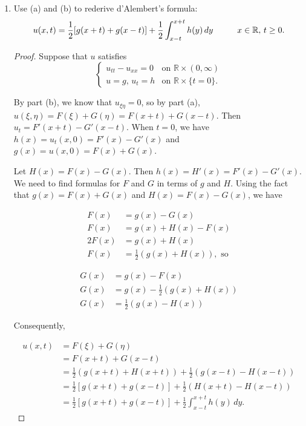 \documentclass[11pt,oneside,english]{amsart}
\theoremstyle{definition}
\newcommand{\pspace}{\hspace{10mm}}
\newcommand{\MB}[1]{\mathbb{#1}}
\begin{document}
\begin{enumerate}
\begin{enumerate}
\item Use (a) and (b) to rederive d'Alembert's formula:
\[
u(x,t)=\frac{1}{2}[g(x+t)+g(x-t)]+\frac{1}{2}\int_{x-t}^{x+t}h(y)\,dy\pspace x\in\MB{R},\,t\geq 0.
\]

\begin{proof}
Suppose that $u$ satisfies
\[
\begin{cases} u_{tt}-u_{xx}=0 & \text{on }\MB{R}\times(0,\infty)\\ u=g,\,u_t=h & \text{on }\MB{R}\times\{t=0\}.\end{cases}
\]

By part (b), we know that $u_{\xi\eta}=0$, so by part (a), $u(\xi,\eta)=F(\xi)+G(\eta)=F(x+t)+G(x-t)$. Then $u_t=F'(x+t)-G'(x-t)$. When $t=0$, we have $h(x)=u_t(x,0)=F'(x)-G'(x)$ and $g(x)=u(x,0)=F(x)+G(x)$.

Let $H(x)=F(x)-G(x)$. Then $h(x)=H'(x)=F'(x)-G'(x)$. We need to find formulas for $F$ and $G$ in terms of $g$ and $H$. Using the fact that $g(x)=F(x)+G(x)$ and $H(x)=F(x)-G(x)$, we have

\begin{multicols}{2}
\begin{align*}
F(x)&=g(x)-G(x)\\[2mm]
F(x)&=g(x)+H(x)-F(x)\\[2mm]
2F(x)&=g(x)+H(x)\\[2mm]
F(x)&=\frac{1}{2}(g(x)+H(x)),\text{ so}
\end{align*}

\begin{align*}
G(x)&=g(x)-F(x)\\[2mm]
G(x)&=g(x)-\frac{1}{2}(g(x)+H(x))\\[2mm]
G(x)&=\frac{1}{2}(g(x)-H(x))
\end{align*}
\end{multicols}

Consequently,

\begin{align*}
u(x,t)&=F(\xi)+G(\eta)\\[2mm]
&=F(x+t)+G(x-t)\\[2mm]
&=\frac{1}{2}(g(x+t)+H(x+t))+\frac{1}{2}(g(x-t)-H(x-t))\\[2mm]
&=\frac{1}{2}[g(x+t)+g(x-t)]+\frac{1}{2}(H(x+t)-H(x-t))\\[2mm]
&=\frac{1}{2}[g(x+t)+g(x-t)]+\frac{1}{2}\int_{x-t}^{x+t}h(y)\,dy.
\end{align*}
\end{proof}
\end{enumerate}


\end{enumerate}
\end{document}
